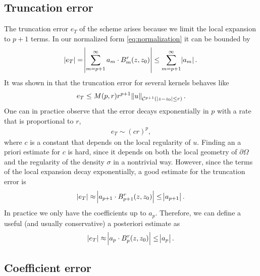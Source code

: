 \documentclass[hidelinks]{siamart1116}
\begin{document}
\subsection{Truncation error}

The truncation error $e_T$ of the scheme arises because we limit the
local expansion to $p+1$ terms. In our normalized form
\eqref{eq:normalization} it can be bounded by
\begin{align}
  \abs{e_T} = \abs{\sum_{m=p+1}^\infty {a}_m \cdot {B}_m^r(z, z_0)} 
  \le \sum_{m=p+1}^\infty \abs{{a}_m} .
\end{align}
It was shown in \cite{Epstein2013} that the truncation error for
several kernels behaves like
\begin{align}
  e_T \le M(p, r) r^{p+1} \norm{u}_{\mathcal C^{p+1}(|z-z_0|\le r)} .
\end{align}
One can in practice observe that the error decays exponentially in $p$
with a rate that is proportional to $r$,
\begin{align}
  e_T \sim (cr)^p,
  \label{eq:eT_exp}
\end{align}
where $c$ is a constant that depends on the local regularity of
$u$. Finding an a priori estimate for $c$ is hard, since it depends on
both the local geometry of ${{\partial\Omega}}$ and the regularity of the density
${\sigma}$ in a nontrivial way. However, since the terms of the local
expansion decay exponentially, a good estimate for the truncation
error is
\begin{align}
  \abs{e_T} \approx \abs{ {a}_{p+1} \cdot {B}_{p+1}^r(z, z_0) }
  \le \abs{ {a}_{p+1} } .
\end{align}
In practice we only have the coefficients up to ${a}_p$. Therefore,
we can define a useful (and usually conservative) a posteriori
estimate as
\begin{align}
  \abs{e_T} \approx \abs{ {a}_p \cdot {B}_p^r(z, z_0) }
  \le \abs{ {a}_p } .
\end{align}

\subsection{Coefficient error}
\end{document}
